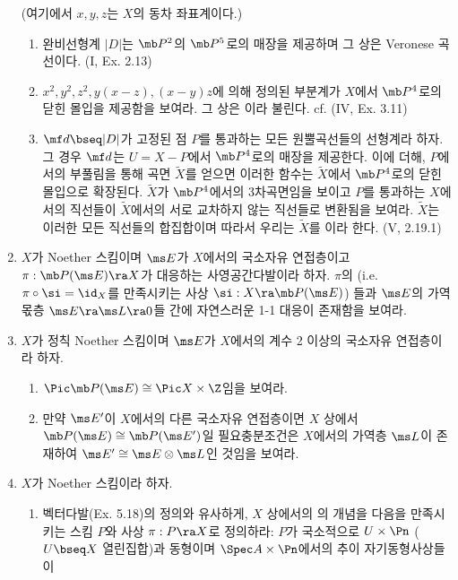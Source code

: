 \begin{enumerate}[label=\tb{7.\arabic*.},itemindent=0mm,itemsep=2mm]
	(여기에서 $x,y,z$는 $X$의 동차 좌표계이다.)
	\begin{enumerate}[label=(\alph*)]
	\item 완비선형계 $|D|$는 $\mb P^2$의 $\mb P^5$로의 매장을 제공하며 그 상은 Veronese 곡선이다. (I, Ex. 2.13)
	\item $x^2,y^2,z^2,y(x-z),(x-y)z$에 의해 정의된 부분계가 $X$에서 $\mb P^4$로의 닫힌 몰입을 제공함을 보여라.
	그 상은 이라 불린다. cf. (IV, Ex. 3.11)
	\item $\mf d\bseq|D|$가 고정된 점 $P$를 통과하는 모든 원뿔곡선들의 선형계라 하자.
	그 경우 $\mf d$는 $U=X-P$에서 $\mb P^4$로의 매장을 제공한다.
	이에 더해, $P$에서의 부풀림을 통해 곡면 $\tilde X$를 얻으면 이러한 함수는 $\tilde X$에서 $\mb P^4$로의 닫힌 몰입으로 확장된다.
	$\tilde X$가 $\mb P^4$에서의 3차곡면임을 보이고 $P$를 통과하는 $X$에서의 직선들이
	$\tilde X$에서의 서로 교차하지 않는 직선들로 변환됨을 보여라.
	$\tilde X$는 이러한 모든 직선들의 합집합이며 따라서 우리는 $\tilde X$를 이라 한다. (V, 2.19.1)
	\end{enumerate}
	\item $X$가 Noether 스킴이며 $\ms E$가 $X$에서의 국소자유 연접층이고 $\pi:\mb P(\ms E)\ra X$가 대응하는 사영공간다발이라 하자.
	$\pi$의 (i.e. $\pi\circ\si=\id_X$를 만족시키는 사상 $\si:X\ra\mb P(\ms E)$)%
	들과 $\ms E$의 가역 몫층 $\ms E\ra\ms L\ra 0$들 간에 자연스러운 1-1 대응이 존재함을 보여라.
	\item $X$가 정칙 Noether 스킴이며 $\ms E$가 $X$에서의 계수 2 이상의 국소자유 연접층이라 하자.
	\begin{enumerate}[label=(\alph*)]
	\item $\Pic\mb P(\ms E)\cong\Pic X\times\Z$임을 보여라.
	\item 만약 $\ms E'$이 $X$에서의 다른 국소자유 연접층이면 $X$ 상에서 $\mb P(\ms E)\cong\mb P(\ms E')$일 필요충분조건은
	$X$에서의 가역층 $\ms L$이 존재하여 $\ms E'\cong\ms E\otimes\ms L$인 것임을 보여라.
	\end{enumerate}
	\item {} $X$가 Noether 스킴이라 하자.
	\begin{enumerate}[label=(\alph*)]
	\item 벡터다발(Ex. 5.18)의 정의와 유사하게, $X$ 상에서의 의 개념을
	다음을 만족시키는 스킴 $P$와 사상 $\pi:P\ra X$로 정의하라:
	$P$가 국소적으로 $U\times\Pn$ ($U\bseq X$ 열린집합)과 동형이며 $\Spec A\times\Pn$에서의 추이 자기동형사상들이

\end{enumerate}
\end{enumerate}
